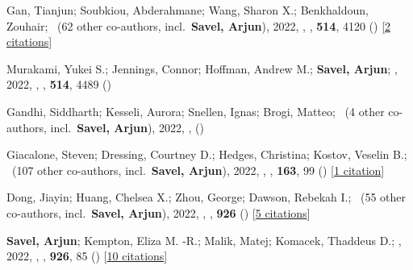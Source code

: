 \item[{\color{numcolor}\scriptsize13}] Gan, Tianjun; Soubkiou, Abderahmane; Wang, Sharon X.; Benkhaldoun, Zouhair; \etal\ ({62} other co-authors, incl.\ \textbf{Savel, Arjun}), 2022, , \mnras, \textbf{514}, 4120 () [\href{https://ui.adsabs.harvard.edu/abs/2022MNRAS.514.4120G}{2 citations}]

\item[{\color{numcolor}\scriptsize12}] Murakami, Yukei S.; Jennings, Connor; Hoffman, Andrew M.; \textbf{Savel, Arjun}; \etal, 2022, , \mnras, \textbf{514}, 4489 ()

\item[{\color{numcolor}\scriptsize11}] Gandhi, Siddharth; Kesseli, Aurora; Snellen, Ignas; Brogi, Matteo; \etal\ ({4} other co-authors, incl.\ \textbf{Savel, Arjun}), 2022, , \mnras ()

\item[{\color{numcolor}\scriptsize10}] Giacalone, Steven; Dressing, Courtney D.; Hedges, Christina; Kostov, Veselin B.; \etal\ ({107} other co-authors, incl.\ \textbf{Savel, Arjun}), 2022, , \aj, \textbf{163}, 99 () [\href{https://ui.adsabs.harvard.edu/abs/2022AJ....163...99G}{1 citation}]

\item[{\color{numcolor}\scriptsize9}] Dong, Jiayin; Huang, Chelsea X.; Zhou, George; Dawson, Rebekah I.; \etal\ ({55} other co-authors, incl.\ \textbf{Savel, Arjun}), 2022, , \apj, \textbf{926} () [\href{https://ui.adsabs.harvard.edu/abs/2022ApJ...926L...7D}{5 citations}]

\item[{\color{numcolor}\scriptsize8}] \textbf{Savel, Arjun}; Kempton, Eliza M. -R.; Malik, Matej; Komacek, Thaddeus D.; \etal, 2022, , \apj, \textbf{926}, 85 () [\href{https://ui.adsabs.harvard.edu/abs/2022ApJ...926...85S}{10 citations}]

